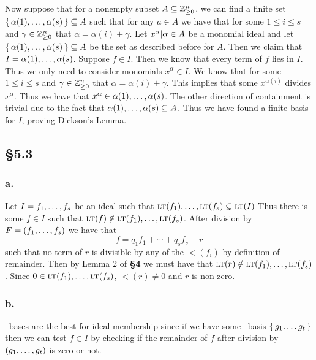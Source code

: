 \documentclass[letterpaper]{article}
\begin{document}
Now suppose that for a nonempty subset $A \subseteq \mathbb{Z}_{\geq 0}^{n}$, we can find a finite set $\set{\alpha(1), \ldots, \alpha(s)} \subseteq A$ such that for any $a \in A$ we have that for some $1 \leq i \leq s$ and $\gamma \in \mathbb{Z}_{\geq 0}^{n}$ that $\alpha = \alpha(i) + \gamma$.
Let $\gen{x^{\alpha} | \alpha \in A}$ be a monomial ideal and let $\set{\alpha(1), \ldots, \alpha(s)} \subseteq A$ be the set as described before for $A$.
Then we claim that $I = \gen{\alpha(1), \ldots, \alpha(s)}$.
Suppose $f \in I$.
Then we know that every term of $f$ lies in $I$.
Thus we only need to consider monomials $x^{\alpha} \in I$.
We know that for some $1 \leq i \leq s$ and $\gamma \in \mathbb{Z}_{\geq 0}^{n}$ that $\alpha = \alpha(i) + \gamma$.
This implies that some $x^{\alpha(i)}$ divides $x^{\alpha}$.
Thus we have that $x^{\alpha} \in \gen{\alpha(1), \ldots, \alpha(s)}$.
The other direction of containment is trivial due to the fact that $\gen{\alpha(1), \ldots, \alpha(s)} \subseteq A$.
Thus we have found a finite basis for $I$, proving Dickson's Lemma.

\subsection*{\S 5.3}

\subsubsection*{a.}

Let $I = \gen{f_{1}, \ldots, f_{s}}$ be an ideal such that $\gen{\lt(f_{1}), \ldots, \lt(f_{s})} \subsetneq \gen{\lt(I)}$ Thus there is some $f \in I$ such that $\lt(f) \notin \gen{\lt(f_{1}), \ldots, \lt(f_{s})}$.
After division by $F = \pqty{f_{1}, \ldots, f_{s}}$ we have that
\[
  f = q_{1}f_{1} + \cdots + q_{s}f_{s} + r
\]
such that no term of $r$ is divisible by any of the $\lt(f_{i})$ by definition of remainder.
Then by Lemma 2 of \textbf{\S 4} we must have that $\lt(r) \notin \gen{\lt(f_{1}), \ldots, \lt(f_{s})}$.
Since $0 \in \gen{\lt(f_{1}), \ldots, \lt(f_{s})}$, $\lt(r) \neq 0$ and $r$ is non-zero.

\subsubsection*{b.}

\Grobner\ bases are the best for ideal membership since if we have some \Grobner\ basis $\set{g_{1}.
\ldots g_{t}}$ then we can test $f \in I$ by checking if the remainder of $f$ after division by $\pqty{g_{1}, \ldots, g_{t}}$ is zero or not.
\end{document}
